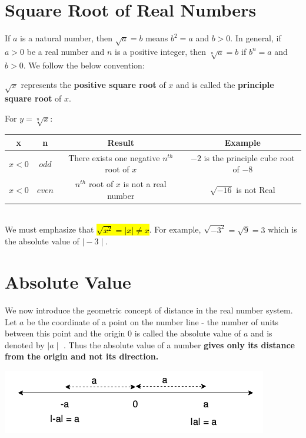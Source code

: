 \documentclass{book}
\begin{document}
	\section{Square Root of Real Numbers}
If $a$ is a natural number, then $\sqrt{a} = b$ means $b^2 = a$ and $b>0$. In general, if $a>0$ be a real number and $n$ is a positive integer, then $\sqrt[n]{a} = b$ if $b^n =a$ and $b>0$. We follow the below convention:
\begin{mdframed} [backgroundcolor=yellow] 
	$\sqrt x$  represents the \textbf{positive square root} of $x$ and is called the  \textbf{principle square root } of $x$.
\end{mdframed}
For \textbf{$y=\sqrt[n]{x}$}:
\begin{table}[ht]

	\begin{tabular}{c c c c }
		\hline
		x & n & Result & Example \\
		\hline
		$x<0$ & $odd$ & There exists one negative $n^{th}$ root of $x$& $-2$ is the principle cube root of $-8$ \\
		$x<0$ & $even$ & $n^{th}$ root of $x$ is not a real number & $\sqrt{-16}$ is not Real
	\end{tabular}
\end{table}
\\
We must emphasize that \hl{$\sqrt{x^2} = \mid x \mid \neq x$}. For example, $\sqrt{-3^2} = \sqrt{9} = 3$ which is the absolute value of $\mid -3 \mid$.

	\section{Absolute Value}
	We now introduce the geometric concept of distance in the real number system. Let $a$ be the coordinate of a point on the number line - the number of units between this point and the origin $0$ is called the absolute value of $a$ and is denoted by \textbf{$\mid a \mid$} . Thus the absolute value of a number \textbf{gives only its distance from the origin and not its direction.}
	
	\includegraphics[scale=0.6]{absvalue} \\
\end{document}
